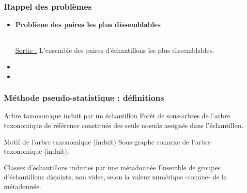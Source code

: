 \documentclass{beamer}
\begin{document}
\begin{frame}
\frametitle{Rappel des problèmes}

\begin{itemize}
\item \begin{flushcenter} \bf Problème des paires les plus dissemblables\end{flushcenter}\\ \uline{Sortie :} L'ensemble des paires d'échantillons les plus dissemblables.
\item {}
\item {}
\end{itemize}


\end{frame}

\begin{frame}
\frametitle{Méthode pseudo-statistique : définitions}

\begin{block}{Arbre taxonomique induit par un échantillon}
Forêt de sous-arbres de l'arbre taxonomique de référence constitués des seuls noeuds assignés dans l'échantillon.
\end{block}

\begin{block}{Motif de l'arbre taxonomique (induit)}
Sous-graphe connexe de l'arbre taxonomique (induit).
\end{block}


\begin{block}{Classes d'échantillons induites par une métadonnée}
Ensemble de groupes d'échantillons disjoints, non vides, selon la valeur numérique -connue- de la métadonnée.
\end{block}


\end{frame}
\end{document}
